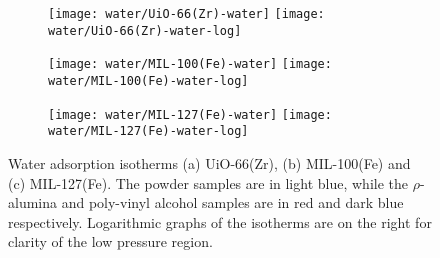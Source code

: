 \begin{figure}[p!]
    \centering

    \begin{subfigure}{\linewidth}
        \centering
        \parbox{0.1\linewidth}{\caption{}\label{fgr:shaping:wateruio66}}%
        \texttt{[image: water/UiO-66(Zr)-water]}%
        \texttt{[image: water/UiO-66(Zr)-water-log]}%
    \end{subfigure}

    \begin{subfigure}{\linewidth}
        \centering
        \parbox{0.1\linewidth}{\caption{}\label{fgr:shaping:watermil100}}%
        \texttt{[image: water/MIL-100(Fe)-water]}%
        \texttt{[image: water/MIL-100(Fe)-water-log]}%
    \end{subfigure}

    \begin{subfigure}{\linewidth}
        \centering
        \parbox{0.1\linewidth}{\caption{}\label{fgr:shaping:watermil127}}%
        \texttt{[image: water/MIL-127(Fe)-water]}%
        \texttt{[image: water/MIL-127(Fe)-water-log]}%
    \end{subfigure}
    
    \caption{Water adsorption isotherms (a) UiO-66(Zr), 
    (b) MIL-100(Fe) and (c) MIL-127(Fe). The powder samples are in light
    blue, while the \(\rho\)-alumina and poly-vinyl alcohol samples are in red
    and dark blue respectively. Logarithmic graphs of the isotherms are
    on the right for clarity of the low
    pressure region.}%
    \label{fgr:shaping:wateradsorption}
\end{figure}


